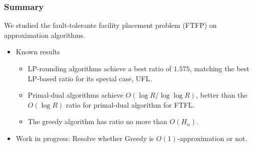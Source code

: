 \documentclass[hyperref, xcolor=dvipsnames]{beamer}
\begin{document}
\begin{frame}
  \frametitle{Summary} We studied the fault-tolerante facility
  placement problem (FTFP) on approximation algorithms.

  \begin{itemize}
  \item Known results
    \begin{itemize}
    \item LP-rounding algorithms achieve a best ratio of $1.575$,
      matching the best LP-based ratio for its special case, UFL.
    \item Primal-dual algorithms achieve $O(\log R/\log\log R)$,
      better than the $O(\log R)$ ratio for primal-dual algorithm for
      FTFL.
    \item The greedy algorithm has ratio no more than $O(H_n)$.
  \end{itemize}
  \item Work in progress:
    Resolve whether Greedy is $O(1)$-approximation or not.
  \end{itemize}
\end{frame}
\end{document}
